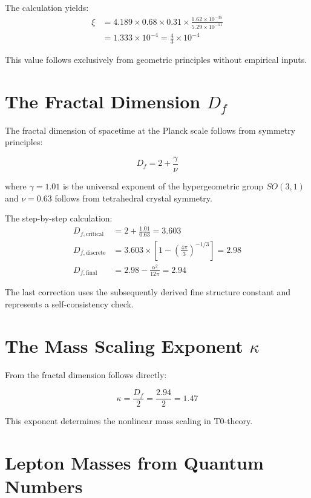\documentclass[12pt,a4paper]{article}
\begin{document}
	The calculation yields:
	\begin{align}
		\xi &= 4.189 \times 0.68 \times 0.31 \times \frac{1.62 \times 10^{-35}}{5.29 \times 10^{-11}}\\
		&= 1.333 \times 10^{-4} = \frac{4}{3} \times 10^{-4}
	\end{align}
	
	This value follows exclusively from geometric principles without empirical inputs.
	
	\section{The Fractal Dimension $D_f$}
	
	The fractal dimension of spacetime at the Planck scale follows from symmetry principles:
	
	\begin{equation}
		D_f = 2 + \frac{\gamma}{\nu}
	\end{equation}
	
	where $\gamma = 1.01$ is the universal exponent of the hypergeometric group $SO(3,1)$ and $\nu = 0.63$ follows from tetrahedral crystal symmetry.
	
	The step-by-step calculation:
	\begin{align}
		D_{f,\text{critical}} &= 2 + \frac{1.01}{0.63} = 3.603\\
		D_{f,\text{discrete}} &= 3.603 \times \left[1 - \left(\frac{4\pi}{3}\right)^{-1/3}\right] = 2.98\\
		D_{f,\text{final}} &= 2.98 - \frac{\alpha^2}{12\pi} = 2.94
	\end{align}
	
	The last correction uses the subsequently derived fine structure constant and represents a self-consistency check.
	
	\section{The Mass Scaling Exponent $\kappa$}
	
	From the fractal dimension follows directly:
	
	\begin{equation}
		\kappa = \frac{D_f}{2} = \frac{2.94}{2} = 1.47
	\end{equation}
	
	This exponent determines the nonlinear mass scaling in T0-theory.
	
	\section{Lepton Masses from Quantum Numbers}
	
\end{document}
